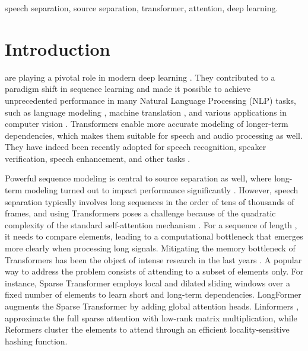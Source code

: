 \documentclass[lettersize,journal]{IEEEtran}
\begin{document}
\begin{IEEEkeywords}
speech separation, source separation, transformer, attention, deep learning.
\end{IEEEkeywords}






\IEEEpeerreviewmaketitle

\newcommand{\mixture}{x}
\newcommand{\ldim}{F}
\newcommand{\len}{T}
\newcommand{\llen}{T'}
\newcommand{\nspk}{Ns}
\newcommand{\nsepf}{M}
\newcommand{\chnksize}{C}
\newcommand{\hopsize}{H}
\newcommand{\numchnks}{Nc}
\newcommand{\numintra}{N_\text{intra}}
\newcommand{\numinter}{N_\text{inter}}

\newcommand{\cem}[1]{#1}
\newcommand{\cemAQ}[1]{#1}

\section{Introduction}
 are playing a pivotal role in modern deep learning \cite{vaswani2017}. They contributed to a paradigm shift in sequence learning and made it possible to achieve unprecedented performance in many Natural Language Processing (NLP) tasks, such as language modeling \cite{devlin-etal-2019-bert}, machine translation \cite{liu-etal-2020-multilingual-denoising}, and various applications in computer vision \cite{dosovitskiy2021image, gong2021vision}.
Transformers enable more accurate modeling of longer-term dependencies, which makes them suitable for speech and audio processing as well.
They have indeed been recently adopted for speech recognition, speaker verification, speech enhancement, and other tasks \cite{dong2018speechtransformer, gulati2020conformer}. 

\cem{Powerful sequence modeling is central to source separation as well, where long-term modeling turned out to impact performance significantly \cite{luo2020dualpath, dptn}.
However, speech separation typically involves long sequences in the order of tens of thousands of frames, and using Transformers poses a challenge because of the quadratic complexity of the standard self-attention mechanism \cite{vaswani2017}. 
For a sequence of length , it needs to compare  elements, leading to a computational bottleneck that emerges more clearly when processing long signals}. Mitigating the memory bottleneck of Transformers has been the object of intense research in the last years \cite{child2019generatingsparse, beltagy2020longformer, wang2020linformer, kitaev2020reformer}.
A popular way to address the problem consists of attending to a subset of elements only. For instance, Sparse Transformer \cite{child2019generatingsparse} employs local and dilated sliding windows over a fixed number of elements to learn short and long-term dependencies. LongFormer \cite{beltagy2020longformer} augments the Sparse Transformer by adding global attention heads. Linformers \cite{wang2020linformer}, approximate the full sparse attention with low-rank matrix multiplication, while Reformers \cite{kitaev2020reformer} cluster the elements to attend through an efficient locality-sensitive hashing function. 
\end{document}
